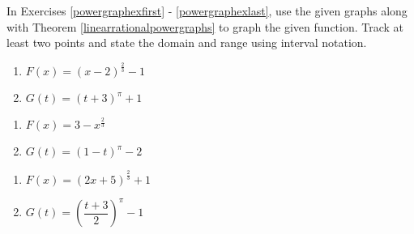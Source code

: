 \documentclass{ximera}
\begin{document}
	\author{Stitz-Zeager}



In Exercises \ref{powergraphexfirst} - \ref{powergraphexlast}, use the given graphs along with Theorem \ref{linearrationalpowergraphs} to graph the given function.  Track at least two points and state the domain and range using interval notation.

\begin{center}

\begin{multicols}{2}









\end{multicols}
\end{center}

\begin{multicols}{2}
\begin{enumerate}

\item $F(x) = (x-2)^{\frac{2}{3}}-1$ \label{powergraphexfirst}
\item $G(t) = (t+3)^{\pi} +1$

\setcounter{HW}{\value{enumi}}
\end{enumerate}
\end{multicols}

\begin{multicols}{2}
\begin{enumerate}
\setcounter{enumi}{\value{HW}}
\item $F(x) = 3-x^{\frac{2}{3}}$ 
\item $G(t) = (1-t)^{\pi}-2$  

\setcounter{HW}{\value{enumi}}
\end{enumerate}
\end{multicols}


\begin{multicols}{2}
\begin{enumerate}
\setcounter{enumi}{\value{HW}}

\item $F(x) =(2x+5)^{\frac{2}{3}}+1$ 
\item $G(t) = \left( \dfrac{t+3}{2}\right)^{\pi}-1$ \label{powergraphexlast}
\setcounter{HW}{\value{enumi}}
\end{enumerate}
\end{multicols}
\end{document}
